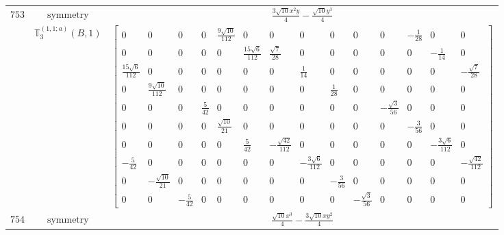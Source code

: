 \documentclass[fleqn,8pt,landscape]{jsarticle}
\begin{document}
\begin{longtable}{ccc}
$ 753 $ & $ \text{symmetry} $ & $ \frac{3 \sqrt{10} x^{2} y}{4} - \frac{\sqrt{10} y^{3}}{4} $ \\
$  $ & $ \mathbb{T}_{3}^{(1,1;a)}(B,1) $ & $ \begin{bmatrix} 0 & 0 & 0 & 0 & \frac{9 \sqrt{10}}{112} & 0 & 0 & 0 & 0 & 0 & 0 & - \frac{1}{28} & 0 & 0 \\ 0 & 0 & 0 & 0 & 0 & \frac{15 \sqrt{6}}{112} & \frac{\sqrt{7}}{28} & 0 & 0 & 0 & 0 & 0 & - \frac{1}{14} & 0 \\ \frac{15 \sqrt{6}}{112} & 0 & 0 & 0 & 0 & 0 & 0 & \frac{1}{14} & 0 & 0 & 0 & 0 & 0 & - \frac{\sqrt{7}}{28} \\ 0 & \frac{9 \sqrt{10}}{112} & 0 & 0 & 0 & 0 & 0 & 0 & \frac{1}{28} & 0 & 0 & 0 & 0 & 0 \\ 0 & 0 & 0 & \frac{5}{42} & 0 & 0 & 0 & 0 & 0 & 0 & - \frac{\sqrt{3}}{56} & 0 & 0 & 0 \\ 0 & 0 & 0 & 0 & \frac{\sqrt{10}}{21} & 0 & 0 & 0 & 0 & 0 & 0 & - \frac{3}{56} & 0 & 0 \\ 0 & 0 & 0 & 0 & 0 & \frac{5}{42} & - \frac{\sqrt{42}}{112} & 0 & 0 & 0 & 0 & 0 & - \frac{3 \sqrt{6}}{112} & 0 \\ - \frac{5}{42} & 0 & 0 & 0 & 0 & 0 & 0 & - \frac{3 \sqrt{6}}{112} & 0 & 0 & 0 & 0 & 0 & - \frac{\sqrt{42}}{112} \\ 0 & - \frac{\sqrt{10}}{21} & 0 & 0 & 0 & 0 & 0 & 0 & - \frac{3}{56} & 0 & 0 & 0 & 0 & 0 \\ 0 & 0 & - \frac{5}{42} & 0 & 0 & 0 & 0 & 0 & 0 & - \frac{\sqrt{3}}{56} & 0 & 0 & 0 & 0 \end{bmatrix} $ \\ \hline
$ 754 $ & $ \text{symmetry} $ & $ \frac{\sqrt{10} x^{3}}{4} - \frac{3 \sqrt{10} x y^{2}}{4} $ \\

\end{longtable}
\end{document}
